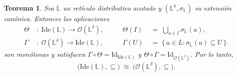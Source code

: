 \documentclass[12pt]{book}
\newtheorem{theorem}{Teorema}[section]
\newcommand{\Id}{\mathrm{Id}}
\begin{document}
\begin{theorem}\label{thm:dualidad-ideales-abiertos}
Sea \(\mathbb{L}\) un retículo distributivo acotado y 
\((\mathbb{L}^{\delta},\sigma_{\mathbb{L}})\) su extensión canónica. 
Entonces las aplicaciones
\[
\begin{aligned}
\Theta \; &: \; \mathrm{Ide}(\mathbb{L}) \longrightarrow \mathcal{O}(\mathbb{L}^\delta), 
\qquad &\Theta(I) &\;=\; \bigcup_{a \in I} \sigma_{\mathbb{L}}(a),\\[4pt]
\Gamma \; &: \; \mathcal{O}(\mathbb{L}^\delta) \longrightarrow \mathrm{Ide}(\mathbb{L}),
\qquad &\Gamma(U) &\;=\; \{\,a \in L : \sigma_{\mathbb{L}}(a)\subseteq U\,\}.
\end{aligned}
\]
son monótonas y satisfacen
\(\Gamma\circ\Theta=\Id_{\mathrm{Ide}(\mathbb{L})}\) y
\(\Theta\circ\Gamma=\Id_{\mathcal{O}(\mathbb{L}^\delta)}\).
Por lo tanto,
\[
  \bigl(\mathrm{Ide}(\mathbb{L}),\subseteq\bigr)
  \;\cong\;
  \bigl(\mathcal{O}(\mathbb{L}^\delta),\subseteq\bigr).
\]
\end{theorem}
\end{document}

